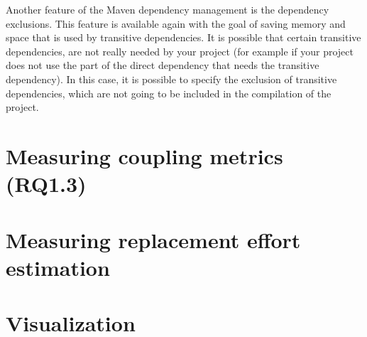 Another feature of the Maven dependency management is the dependency exclusions. This feature is available again with the goal of saving memory and space that is used by transitive dependencies. It is possible that certain transitive dependencies, are not really needed by your project (for example if your project does not use the part of the direct dependency that needs the transitive dependency). In this case, it is possible to specify the exclusion of transitive dependencies, which are not going to be included in the compilation of the project.


\section{Measuring coupling metrics (RQ1.3)}

\section{Measuring replacement effort estimation}

\section{Visualization}
